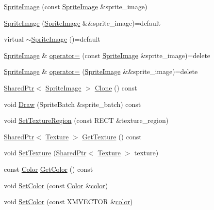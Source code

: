 \begin{DoxyCompactItemize}
\item 
\hyperlink{classmage_1_1_sprite_image_a7ce3b568dc3ff96e7467a8d00bba997d}{Sprite\+Image} (const \hyperlink{classmage_1_1_sprite_image}{Sprite\+Image} \&sprite\+\_\+image)
\item 
\hyperlink{classmage_1_1_sprite_image_aa8e053469bd4032560c315e9f2a7c14b}{Sprite\+Image} (\hyperlink{classmage_1_1_sprite_image}{Sprite\+Image} \&\&sprite\+\_\+image)=default
\item 
virtual \hyperlink{classmage_1_1_sprite_image_ac5e53addd73b174c6b23d3f0d63260c1}{$\sim$\+Sprite\+Image} ()=default
\item 
\hyperlink{classmage_1_1_sprite_image}{Sprite\+Image} \& \hyperlink{classmage_1_1_sprite_image_a20d8e8272cf62599f6c0e4b1ff4f3586}{operator=} (const \hyperlink{classmage_1_1_sprite_image}{Sprite\+Image} \&sprite\+\_\+image)=delete
\item 
\hyperlink{classmage_1_1_sprite_image}{Sprite\+Image} \& \hyperlink{classmage_1_1_sprite_image_a9f83e728a93550f6b20bb4d500483171}{operator=} (\hyperlink{classmage_1_1_sprite_image}{Sprite\+Image} \&\&sprite\+\_\+image)=delete
\item 
\hyperlink{namespacemage_a1e01ae66713838a7a67d30e44c67703e}{Shared\+Ptr}$<$ \hyperlink{classmage_1_1_sprite_image}{Sprite\+Image} $>$ \hyperlink{classmage_1_1_sprite_image_a42ccd883d4d4baf3b84f2b251f612a11}{Clone} () const
\item 
void \hyperlink{classmage_1_1_sprite_image_ae30d3293931f674fea17008063755bb6}{Draw} (Sprite\+Batch \&sprite\+\_\+batch) const
\item 
void \hyperlink{classmage_1_1_sprite_image_a99640fe6fc85d704f6a2831d0f663033}{Set\+Texture\+Region} (const R\+E\+CT \&texture\+\_\+region)
\item 
\hyperlink{namespacemage_a1e01ae66713838a7a67d30e44c67703e}{Shared\+Ptr}$<$ \hyperlink{classmage_1_1_texture}{Texture} $>$ \hyperlink{classmage_1_1_sprite_image_a3c04fb68baaf44e4ee8beb08aff26f35}{Get\+Texture} () const
\item 
void \hyperlink{classmage_1_1_sprite_image_a12e0ffecc7995f13ccf0374fa37dc4c6}{Set\+Texture} (\hyperlink{namespacemage_a1e01ae66713838a7a67d30e44c67703e}{Shared\+Ptr}$<$ \hyperlink{classmage_1_1_texture}{Texture} $>$ texture)
\item 
const \hyperlink{structmage_1_1_color}{Color} \hyperlink{classmage_1_1_sprite_image_a33dff0d92d5b6505da004ea3587dd0ff}{Get\+Color} () const
\item 
void \hyperlink{classmage_1_1_sprite_image_a3f4ef2e0a24c2e9deeb6827bf438ae21}{Set\+Color} (const \hyperlink{structmage_1_1_color}{Color} \&\hyperlink{namespacemage_a56eceea5a9bceb2b56073f3ea4945781}{color})
\item 
void \hyperlink{classmage_1_1_sprite_image_a936547b1852b2249f03c3187bc354ee8}{Set\+Color} (const X\+M\+V\+E\+C\+T\+OR \&\hyperlink{namespacemage_a56eceea5a9bceb2b56073f3ea4945781}{color})
\end{DoxyCompactItemize}

